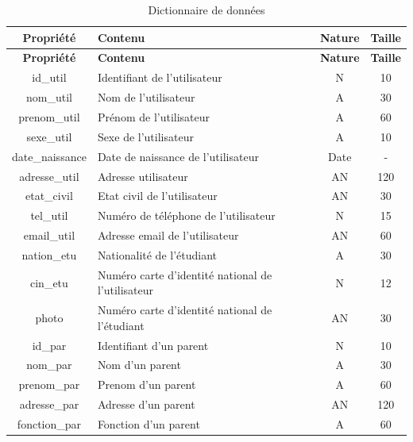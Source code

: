 \begin{center}
	{\renewcommand{\arraystretch}{1.5} %
		\setlongtables		
			\begin{longtable}{|c|>{\centering}m{7cm}|c|c|}
		
				\caption{Dictionnaire de données}
				\label{Dictionnaire de données}
				\endfirsthead
				
				\hline \textbf{Propriété} & \textbf{Contenu} & \textbf{Nature} & \textbf{Taille}\\
				\hline
				\endhead
				
				\endfoot
				

				\hline \textbf{Propriété} & \textbf{Contenu} & \textbf{Nature} & \textbf{Taille}\\
				
				\hline id\_util & Identifiant de l'utilisateur & N & 10 \\ 
				\hline nom\_util & Nom de l'utilisateur & A & 30 \\ 
				\hline prenom\_util & Prénom de l'utilisateur & A & 60 \\ 
				\hline sexe\_util & Sexe de l'utilisateur & A & 10 \\ 
				\hline date\_naissance & Date de naissance de l'utilisateur & Date & - \\
				\hline adresse\_util & Adresse utilisateur & AN & 120 \\
				\hline etat\_civil & Etat civil de l'utilisateur & AN & 30 \\
				\hline tel\_util & Numéro de téléphone de l'utilisateur & N & 15 \\
				\hline email\_util & Adresse email de l'utilisateur & AN & 60 \\
				\hline nation\_etu & Nationalité de l'étudiant & A & 30 \\
				\hline cin\_etu & Numéro carte d'identité national de l'utilisateur & N & 12 \\
				\hline photo & Numéro carte d'identité national de l'étudiant & AN & 30 \\
				
				\hline id\_par & Identifiant d'un parent & N & 10 \\
				\hline nom\_par & Nom d'un parent & A & 30 \\
				\hline prenom\_par & Prenom d'un parent & A & 60 \\
				\hline adresse\_par & Adresse d'un parent & AN & 120 \\
				\hline fonction\_par & Fonction d'un parent & A & 60 \\
				

\end{longtable}}
\end{center}
